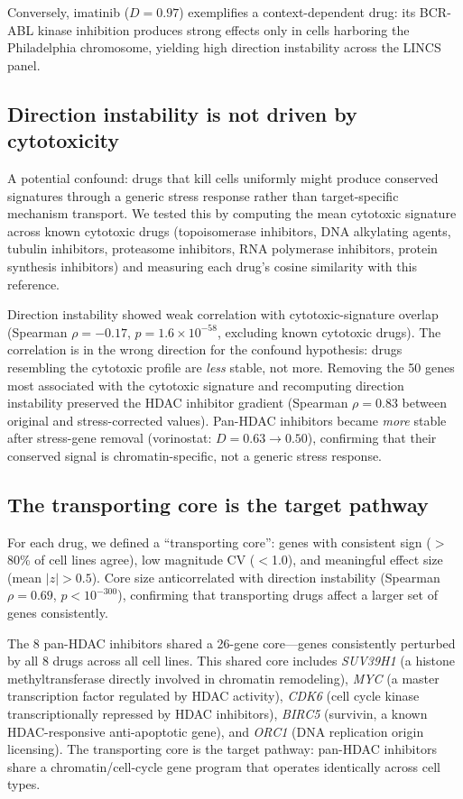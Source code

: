 \documentclass[11pt]{article}
\begin{document}
Conversely, imatinib ($D = 0.97$) exemplifies a context-dependent drug:
its BCR-ABL kinase inhibition produces strong effects only in cells
harboring the Philadelphia chromosome, yielding high direction instability
across the LINCS panel.

\subsection{Direction instability is not driven by cytotoxicity}

A potential confound: drugs that kill cells uniformly might produce
conserved signatures through a generic stress response rather than
target-specific mechanism transport. We tested this by computing the
mean cytotoxic signature across known cytotoxic drugs (topoisomerase
inhibitors, DNA alkylating agents, tubulin inhibitors, proteasome
inhibitors, RNA polymerase inhibitors, protein synthesis inhibitors)
and measuring each drug's cosine similarity with this reference.

Direction instability showed weak correlation with cytotoxic-signature
overlap (Spearman $\rho = -0.17$, $p = 1.6 \times 10^{-58}$,
excluding known cytotoxic drugs). The correlation is in the wrong
direction for the confound hypothesis: drugs resembling the cytotoxic
profile are \emph{less} stable, not more. Removing the 50 genes
most associated with the cytotoxic signature and recomputing direction
instability preserved the HDAC inhibitor gradient (Spearman
$\rho = 0.83$ between original and stress-corrected values). Pan-HDAC
inhibitors became \emph{more} stable after stress-gene removal
(vorinostat: $D = 0.63 \to 0.50$), confirming that their conserved
signal is chromatin-specific, not a generic stress response.

\subsection{The transporting core is the target pathway}

For each drug, we defined a ``transporting core'': genes with consistent
sign ($>$80\% of cell lines agree), low magnitude CV ($<$1.0), and
meaningful effect size (mean $|z| > 0.5$). Core size anticorrelated with
direction instability (Spearman $\rho = 0.69$, $p < 10^{-300}$),
confirming that transporting drugs affect a larger set of genes
consistently.

The 8 pan-HDAC inhibitors shared a 26-gene core---genes consistently
perturbed by all 8 drugs across all cell lines. This shared core
includes \emph{SUV39H1} (a histone methyltransferase directly involved
in chromatin remodeling), \emph{MYC} (a master transcription factor
regulated by HDAC activity), \emph{CDK6} (cell cycle kinase
transcriptionally repressed by HDAC inhibitors), \emph{BIRC5}
(survivin, a known HDAC-responsive anti-apoptotic gene), and \emph{ORC1}
(DNA replication origin licensing). The transporting core is the target
pathway: pan-HDAC inhibitors share a chromatin/cell-cycle gene program
that operates identically across cell types.
\end{document}
